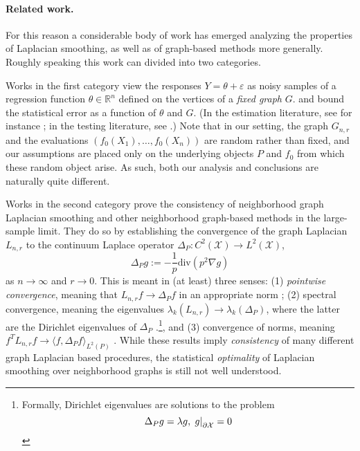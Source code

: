 \documentclass{article}
\newcommand{\Reals}{\mathbb{R}}
\newcommand{\restr}[2]{\ensuremath{\left.#1\right|_{#2}}}
\newcommand{\1}{\mathbf{1}}
\newcommand{\Lap}{L}
\newcommand{\Xset}{\mathcal{X}}
\newcommand{\Leb}{L}
\newcommand{\dive}{\mathrm{div}}
\theoremstyle{alden}
\theoremstyle{aldenthm}
\theoremstyle{definition}
\theoremstyle{remark}
\begin{document}
\paragraph{Related work.} For this reason a considerable body of work has emerged analyzing the properties of Laplacian smoothing, as well as of graph-based methods more generally. Roughly speaking this work can divided into two categories.

Works in the first category view the responses $Y = \theta + \varepsilon$ as noisy samples of a regression function $\theta \in \Reals^n$ defined on the vertices of a \emph{fixed graph} $G$. and bound the statistical error as a function of $\theta$ and $G$. (In the estimation literature, see for instance \citep{wang2016, sadhanala16,sadhanala17,kirichenko2017,kirichenko2018}; in the testing literature, see \citep{sharpnack2013,sharpnack2013b,sharpnack2015}.) Note that in our setting, the graph $G_{n,r}$ and the evaluations $(f_0(X_1),\ldots,f_0(X_n))$ are random rather than fixed, and our assumptions are placed only on the underlying objects $P$ and $f_0$ from which these random object arise. As such, both our analysis and conclusions are naturally quite different.

Works in the second category prove the consistency of neighborhood graph Laplacian smoothing and other neighborhood graph-based methods in the large-sample limit. They do so by establishing the convergence of the graph Laplacian $\Lap_{{n,r}}$ to the continuum Laplace operator $\Delta_P: C^2(\Xset) \to \Leb^2(\Xset)$,
\begin{equation}
\label{eqn:laplace_operator}
\Delta_Pg := -\frac{1}{p} \dive(p^2 \nabla g)
\end{equation}
as $n \to \infty$ and $r \to 0$. This is meant in (at least) three senses: (1) \emph{pointwise convergence}, meaning that $\Lap_{n,r}f \to \Delta_Pf$ in an appropriate norm \citep{belkin03,belkin05,lafon04,hein05,singer06,gine06}; (2) spectral convergence, meaning the eigenvalues $\lambda_k(\Lap_{n,r}) \to \lambda_k(\Delta_P)$, where the latter are the Dirichlet eigenvalues of $\Delta_P$ \citep{belkin07,burago2014,trillos2018,trillos2019,calder2019}.\footnote{\label{footnote:dirichlet_eigenvalues} Formally, Dirichlet eigenvalues are solutions to the problem
	$$
	\Delta_Pg = \lambda g,\\
	\restr{g}{\partial \Xset} = 0
	$$}, and (3) convergence of norms, meaning $f^T \Lap_{n,r} f \to \langle f,\Delta_Pf \rangle_{\Leb^2(P)}$ \citep{bousquet03,hein06,zhou11}. While these results imply \emph{consistency} of many different graph Laplacian based procedures, the statistical \emph{optimality} of Laplacian smoothing over neighborhood graphs is still not well understood.
\end{document}
